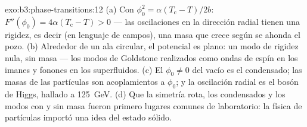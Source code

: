 \begin{solution}{exo:b3:phase-transitions:12}
(a) Con $\phi_0^2 = \alpha(T_{\text{c}} - T)/2b$: $F''(\phi_0) =
4\alpha(T_{\text{c}} - T) > 0$ --- las oscilaciones en la dirección
radial tienen una rigidez, es decir (en lenguaje de campos), una masa que
crece según se ahonda el pozo. (b) Alrededor de un ala circular, el
potencial es plano: un modo de rigidez nula, sin masa --- los
modos de Goldstone realizados como ondas de espín en los imanes y fonones en
los superfluidos. (c) El $\phi_0 \neq 0$ del vacío es el condensado;
las masas de las partículas son acoplamientos a $\phi_0$; y la oscilación radial
es el bosón de Higgs, hallado a \qty{125}{GeV}. (d) Que la simetría
rota, los condensados y los modos con y sin masa fueron primero lugares comunes
de laboratorio: la física de partículas importó una idea del estado sólido.
\end{solution}

